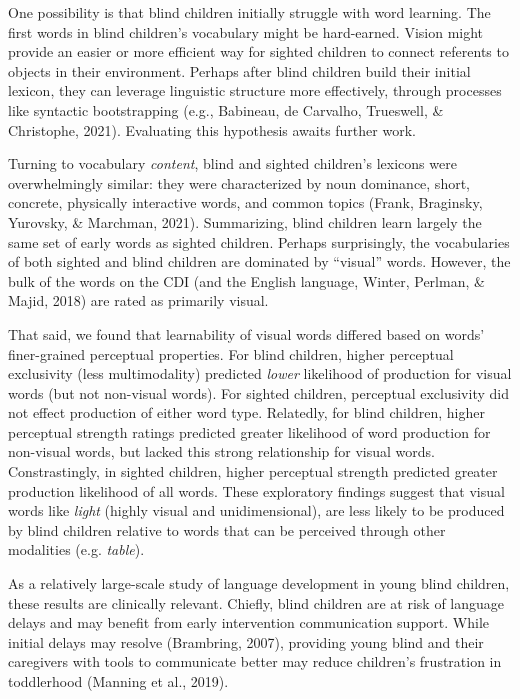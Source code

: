 \documentclass[english,man,floatsintext]{apa6}
\begin{document}
One possibility is that blind children initially struggle with word learning. The first words in blind children's vocabulary might be hard-earned. Vision might provide an easier or more efficient way for sighted children to connect referents to objects in their environment. Perhaps after blind children build their initial lexicon, they can leverage linguistic structure more effectively, through processes like syntactic bootstrapping (e.g., Babineau, de Carvalho, Trueswell, \& Christophe, 2021). Evaluating this hypothesis awaits further work.

Turning to vocabulary \emph{content}, blind and sighted children's lexicons were overwhelmingly similar: they were characterized by noun dominance, short, concrete, physically interactive words, and common topics (Frank, Braginsky, Yurovsky, \& Marchman, 2021). Summarizing, blind children learn largely the same set of early words as sighted children. Perhaps surprisingly, the vocabularies of both sighted and blind children are dominated by \enquote{visual} words. However, the bulk of the words on the CDI (and the English language, Winter, Perlman, \& Majid, 2018) are rated as primarily visual.

That said, we found that learnability of visual words differed based on words' finer-grained perceptual properties. For blind children, higher perceptual exclusivity (less multimodality) predicted \emph{lower} likelihood of production for visual words (but not non-visual words). For sighted children, perceptual exclusivity did not effect production of either word type. Relatedly, for blind children, higher perceptual strength ratings predicted greater likelihood of word production for non-visual words, but lacked this strong relationship for visual words. Constrastingly, in sighted children, higher perceptual strength predicted greater production likelihood of all words. These exploratory findings suggest that visual words like \emph{light} (highly visual and unidimensional), are less likely to be produced by blind children relative to words that can be perceived through other modalities (e.g. \emph{table}).

As a relatively large-scale study of language development in young blind children, these results are clinically relevant. Chiefly, blind children are at risk of language delays and may benefit from early intervention communication support. While initial delays may resolve (Brambring, 2007), providing young blind and their caregivers with tools to communicate better may reduce children's frustration in toddlerhood (Manning et al., 2019).
\end{document}
